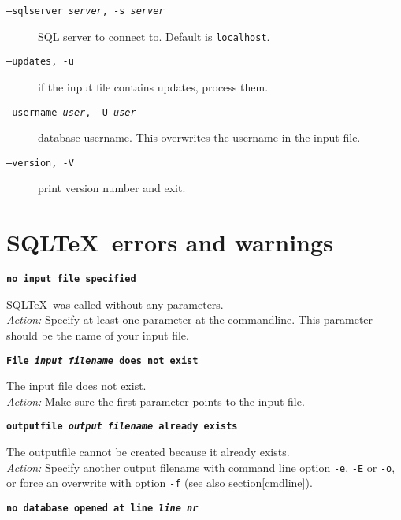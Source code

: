 \documentclass{article}
\newcommand{\vs}{\vspace{3mm}}
\begin{document}
\begin{description}
\item[\texttt{--sqlserver \textit{server}, -s \textit{server}}] SQL server to connect to. Default is \texttt{localhost}.

\item[\texttt{--updates, -u}] if the input file contains updates, process them.

\item[\texttt{--username \textit{user}, -U \textit{user}}] database username. This overwrites the username in the input file.

\item[\texttt{--version, -V}] print version number and exit.
\end{description}



\section{SQL\TeX\ errors and warnings}

\noindent\textbf{\texttt{no input file specified}}

\vspace{1mm}

\noindent SQL\TeX\ was called without any parameters.\\
\textit{Action:} Specify at least one parameter at the commandline. This parameter should be
the name of your input file.

\vs

\noindent\textbf{\texttt{File \textit{input filename} does not exist}}

\vspace{1mm}

\noindent The input file does not exist.\\
\textit{Action:} Make sure the first parameter points to the input file.

\vs

\noindent\textbf{\texttt{outputfile \textit{output filename} already exists}}

\vspace{1mm}

\noindent The outputfile cannot be created because it already exists.\\
\textit{Action:} Specify another output filename with command line option \texttt{-e},
\texttt{-E} or \texttt{-o}, or force an overwrite with option \texttt{-f} (see also section\ref{cmdline}).

\vs

\noindent\textbf{\texttt{no database opened at line \textit{line nr}}}
\end{document}
